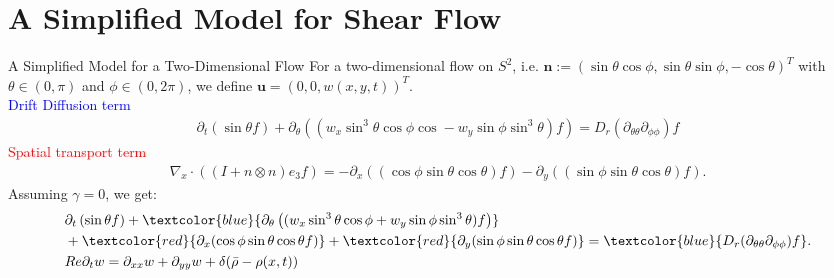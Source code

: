 \section{A Simplified Model for Shear Flow}
\begin{frame}{A Simplified Model for a Two-Dimensional Flow}
	\scriptsize
	For a two-dimensional flow on $S^2$, i.e. $\boldsymbol{n} :=(\sin \theta \cos \phi, \sin \theta \sin \phi, -\cos \theta)^T$ with $\theta \in (0,\pi)$ and $\phi \in (0, 2\pi)$, we define
	$\boldsymbol{u} = \left( 0, 0, w(x,y, t)\right)^T$.\\
	\vspace{0.4cm}
	\pause
\textcolor{blue}{Drift Diffusion term} 
   \begin{align*}
   \partial_{t}\left(\sin \theta f\right) +\partial_\theta\left(( w_x \sin^3 \theta \cos \phi \cos - w_y\sin \phi \sin^3 \theta) f\right) =D_{r}(\partial_{\theta\theta}\partial_{\phi\phi})f
   \end{align*}
\textcolor{red}{Spatial transport term}
\begin{align*}
	\nabla_x \cdot ((I+n \otimes n)e_3f) =  -\partial_x((\cos\phi \sin\theta \cos\theta)f) - \partial_y((\sin\phi \sin \theta \cos \theta)f).
\end{align*}
\pause
Assuming $\gamma = 0$, we get:
\begin{align*}
	&\partial_{t}\left(\sin \theta f\right)+ \textcolor{blue}{\partial_\theta\left(( w_x \sin^3 \theta \cos \phi + w_y\sin \phi \sin^3 \theta) f\right)}\\
	&+\textcolor{red}{\partial_x(\cos\phi \sin\theta \cos\theta f)} + \textcolor{red}{\partial_y(\sin \phi \sin \theta \cos \theta f)}
	= \textcolor{blue}{D_{r}(\partial_{\theta\theta}\partial_{\phi\phi})f}. \\
	&Re\partial_{t}w = \partial_{xx}w + \partial_{yy}w + \delta(\bar{\rho}-\rho(x,t))
\end{align*}
\end{frame}


